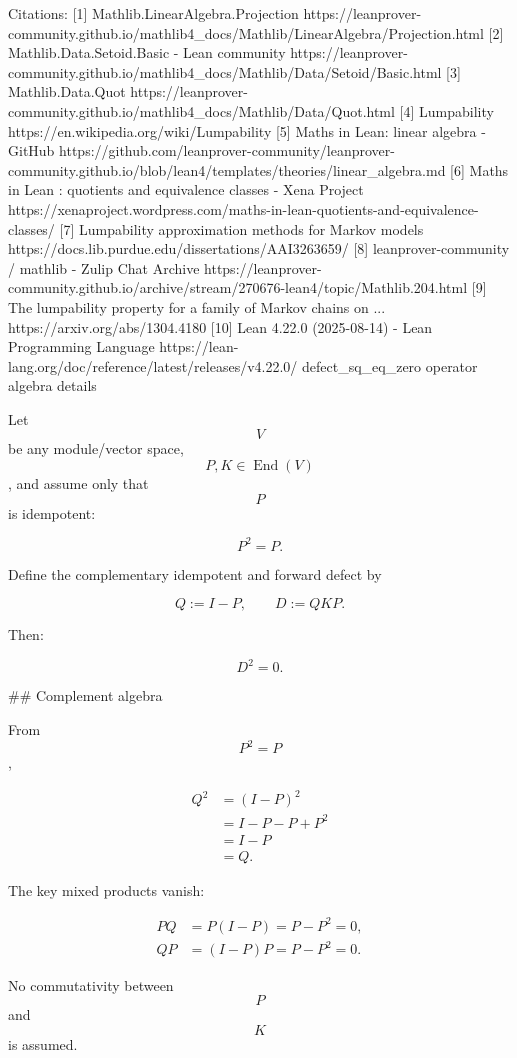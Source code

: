 Citations:
[1] Mathlib.LinearAlgebra.Projection https://leanprover-community.github.io/mathlib4_docs/Mathlib/LinearAlgebra/Projection.html
[2] Mathlib.Data.Setoid.Basic - Lean community https://leanprover-community.github.io/mathlib4_docs/Mathlib/Data/Setoid/Basic.html
[3] Mathlib.Data.Quot https://leanprover-community.github.io/mathlib4_docs/Mathlib/Data/Quot.html
[4] Lumpability https://en.wikipedia.org/wiki/Lumpability
[5] Maths in Lean: linear algebra - GitHub https://github.com/leanprover-community/leanprover-community.github.io/blob/lean4/templates/theories/linear_algebra.md
[6] Maths in Lean : quotients and equivalence classes - Xena Project https://xenaproject.wordpress.com/maths-in-lean-quotients-and-equivalence-classes/
[7] Lumpability approximation methods for Markov models https://docs.lib.purdue.edu/dissertations/AAI3263659/
[8] leanprover-community / mathlib - Zulip Chat Archive https://leanprover-community.github.io/archive/stream/270676-lean4/topic/Mathlib.204.html
[9] The lumpability property for a family of Markov chains on ... https://arxiv.org/abs/1304.4180
[10] Lean 4.22.0 (2025-08-14) - Lean Programming Language https://lean-lang.org/doc/reference/latest/releases/v4.22.0/
defect_sq_eq_zero operator algebra details

Let $$V$$ be any module/vector space, $$P,K\in \operatorname{End}(V)$$, and assume only that $$P$$ is idempotent:

$$
P^2=P.
$$

Define the complementary idempotent and forward defect by

$$
Q:=I-P,
\qquad
D:=QKP.
$$

Then:

$$
\boxed{D^2=0.}
$$

## Complement algebra

From $$P^2=P$$,

$$
\begin{aligned}
Q^2
&=(I-P)^2\\
&=I-P-P+P^2\\
&=I-P\\
&=Q.
\end{aligned}
$$

The key mixed products vanish:

$$
\begin{aligned}
PQ&=P(I-P)=P-P^2=0,\\
QP&=(I-P)P=P-P^2=0.
\end{aligned}
$$

No commutativity between $$P$$ and $$K$$ is assumed.

